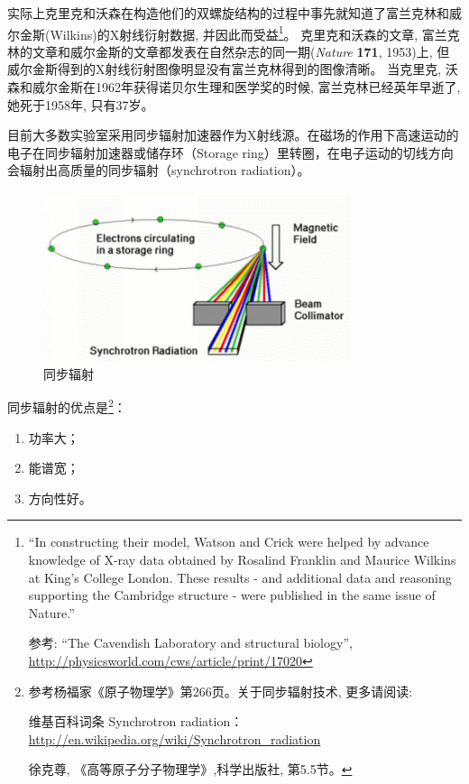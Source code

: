 
实际上克里克和沃森在构造他们的双螺旋结构的过程中事先就知道了富兰克林和威尔金斯(Wilkins)的X射线衍射数据,
并因此而受益\footnote{``In constructing their model, Watson and
Crick were helped by advance knowledge of X-ray data obtained by
Rosalind Franklin and Maurice Wilkins at King's College London.
These results - and additional data and reasoning supporting the
Cambridge structure - were published in the same issue of Nature.''

参考: ``The Cavendish Laboratory and structural biology'',
\url{http://physicsworld.com/cws/article/print/17020}}。
克里克和沃森的文章,
富兰克林的文章和威尔金斯的文章都发表在自然杂志的同一期(\emph{Nature}
\textbf{171}, 1953)上,
但威尔金斯得到的X射线衍射图像明显没有富兰克林得到的图像清晰。
当克里克, 沃森和威尔金斯在1962年获得诺贝尔生理和医学奖的时候,
富兰克林已经英年早逝了, 她死于1958年, 只有37岁。

目前大多数实验室采用同步辐射加速器作为X射线源。在磁场的作用下高速运动的电子在同步辐射加速器或储存环（Storage ring）里转圈，在电子运动的切线方向会辐射出高质量的同步辐射（synchrotron radiation）。

\begin{figure}[htbp]
\begin{center}
\includegraphics[width=9cm]{Duality/synchrotron.png}
\caption{同步辐射}
\end{center}
\end{figure}


同步辐射的优点是\footnote{参考杨福家《原子物理学》第266页。关于同步辐射技术, 更多请阅读: 

维基百科词条 Synchrotron radiation：\url{http://en.wikipedia.org/wiki/Synchrotron_radiation}

徐克尊, 《高等原子分子物理学》,科学出版社, 第5.5节。}：

\begin{enumerate}
    \item 功率大；
    \item 能谱宽；
    \item 方向性好。
\end{enumerate}

